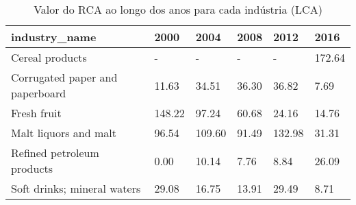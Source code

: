 \begin{table}
\centering
\caption{Valor do RCA ao longo dos anos para cada indústria (LCA)}
\begin{tabular}{p{6cm}p{1.5cm}p{1.5cm}p{1.5cm}p{1.5cm}p{1.5cm}}
\toprule
                  industry\_name &   2000 &   2004 &  2008 &   2012 &   2016 \\
\midrule
                Cereal products &      - &      - &     - &      - & 172.64 \\
Corrugated paper and paperboard &  11.63 &  34.51 & 36.30 &  36.82 &   7.69 \\
                    Fresh fruit & 148.22 &  97.24 & 60.68 &  24.16 &  14.76 \\
          Malt liquors and malt &  96.54 & 109.60 & 91.49 & 132.98 &  31.31 \\
     Refined petroleum products &   0.00 &  10.14 &  7.76 &   8.84 &  26.09 \\
    Soft drinks; mineral waters &  29.08 &  16.75 & 13.91 &  29.49 &   8.71 \\
\bottomrule
\end{tabular}
\end{table}
